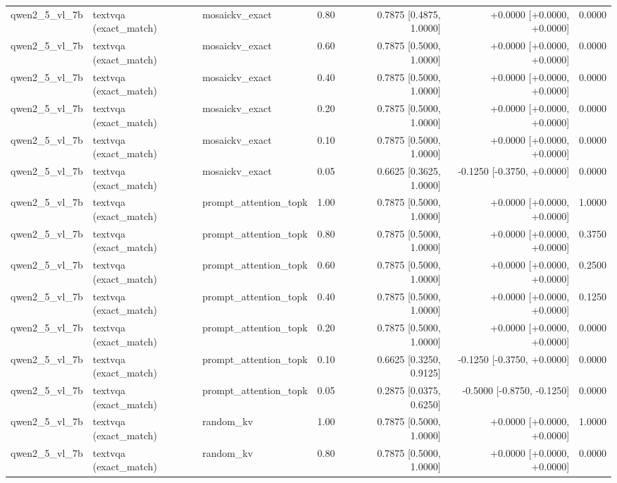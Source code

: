 \begin{longtable}{lllrrrr}
qwen2\_5\_vl\_7b & textvqa (exact\_match) & mosaickv\_exact & 0.80 & 0.7875 [0.4875, 1.0000] & +0.0000 [+0.0000, +0.0000] & 0.0000 \\
qwen2\_5\_vl\_7b & textvqa (exact\_match) & mosaickv\_exact & 0.60 & 0.7875 [0.5000, 1.0000] & +0.0000 [+0.0000, +0.0000] & 0.0000 \\
qwen2\_5\_vl\_7b & textvqa (exact\_match) & mosaickv\_exact & 0.40 & 0.7875 [0.5000, 1.0000] & +0.0000 [+0.0000, +0.0000] & 0.0000 \\
qwen2\_5\_vl\_7b & textvqa (exact\_match) & mosaickv\_exact & 0.20 & 0.7875 [0.5000, 1.0000] & +0.0000 [+0.0000, +0.0000] & 0.0000 \\
qwen2\_5\_vl\_7b & textvqa (exact\_match) & mosaickv\_exact & 0.10 & 0.7875 [0.5000, 1.0000] & +0.0000 [+0.0000, +0.0000] & 0.0000 \\
qwen2\_5\_vl\_7b & textvqa (exact\_match) & mosaickv\_exact & 0.05 & 0.6625 [0.3625, 1.0000] & -0.1250 [-0.3750, +0.0000] & 0.0000 \\
qwen2\_5\_vl\_7b & textvqa (exact\_match) & prompt\_attention\_topk & 1.00 & 0.7875 [0.5000, 1.0000] & +0.0000 [+0.0000, +0.0000] & 1.0000 \\
qwen2\_5\_vl\_7b & textvqa (exact\_match) & prompt\_attention\_topk & 0.80 & 0.7875 [0.5000, 1.0000] & +0.0000 [+0.0000, +0.0000] & 0.3750 \\
qwen2\_5\_vl\_7b & textvqa (exact\_match) & prompt\_attention\_topk & 0.60 & 0.7875 [0.5000, 1.0000] & +0.0000 [+0.0000, +0.0000] & 0.2500 \\
qwen2\_5\_vl\_7b & textvqa (exact\_match) & prompt\_attention\_topk & 0.40 & 0.7875 [0.5000, 1.0000] & +0.0000 [+0.0000, +0.0000] & 0.1250 \\
qwen2\_5\_vl\_7b & textvqa (exact\_match) & prompt\_attention\_topk & 0.20 & 0.7875 [0.5000, 1.0000] & +0.0000 [+0.0000, +0.0000] & 0.0000 \\
qwen2\_5\_vl\_7b & textvqa (exact\_match) & prompt\_attention\_topk & 0.10 & 0.6625 [0.3250, 0.9125] & -0.1250 [-0.3750, +0.0000] & 0.0000 \\
qwen2\_5\_vl\_7b & textvqa (exact\_match) & prompt\_attention\_topk & 0.05 & 0.2875 [0.0375, 0.6250] & -0.5000 [-0.8750, -0.1250] & 0.0000 \\
qwen2\_5\_vl\_7b & textvqa (exact\_match) & random\_kv & 1.00 & 0.7875 [0.5000, 1.0000] & +0.0000 [+0.0000, +0.0000] & 1.0000 \\
qwen2\_5\_vl\_7b & textvqa (exact\_match) & random\_kv & 0.80 & 0.7875 [0.5000, 1.0000] & +0.0000 [+0.0000, +0.0000] & 0.0000 \\

\end{longtable}
